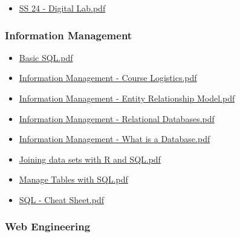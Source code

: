 \documentclass[
  letterpaper,
  DIV=11]{scrartcl}
\providecommand{\tightlist}{%
  \setlength{\itemsep}{0pt}\setlength{\parskip}{0pt}}\usepackage{longtable,booktabs,array}
\begin{document}
\begin{itemize}
\tightlist
\item
  \href{google_slides/digital_lab/SS\%2024\%20-\%20Digital\%20Lab.pdf}{SS
  24 - Digital Lab.pdf}
\end{itemize}

\subsubsection{Information Management}\label{information-management}

\begin{itemize}
\tightlist
\item
  \href{google_slides/information_management/Basic\%20SQL.pdf}{Basic
  SQL.pdf}
\item
  \href{google_slides/information_management/Information\%20Management\%20-\%20Course\%20Logistics.pdf}{Information
  Management - Course Logistics.pdf}
\item
  \href{google_slides/information_management/Information\%20Management\%20-\%20Entity\%20Relationship\%20Model.pdf}{Information
  Management - Entity Relationship Model.pdf}
\item
  \href{google_slides/information_management/Information\%20Management\%20-\%20Relational\%20Databases.pdf}{Information
  Management - Relational Databases.pdf}
\item
  \href{google_slides/information_management/Information\%20Management\%20-\%20What\%20is\%20a\%20Database.pdf}{Information
  Management - What is a Database.pdf}
\item
  \href{google_slides/information_management/Joining\%20data\%20sets\%20with\%20R\%20and\%20SQL.pdf}{Joining
  data sets with R and SQL.pdf}
\item
  \href{google_slides/information_management/Manage\%20Tables\%20with\%20SQL.pdf}{Manage
  Tables with SQL.pdf}
\item
  \href{google_slides/information_management/SQL\%20-\%20Cheat\%20Sheet.pdf}{SQL
  - Cheat Sheet.pdf}
\end{itemize}

\subsubsection{Web Engineering}\label{web-engineering}
\end{document}
